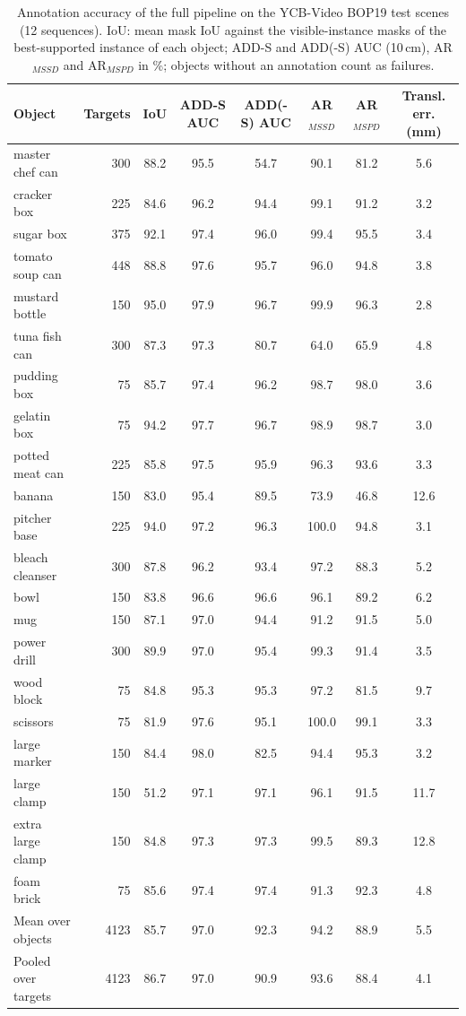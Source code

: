 \begin{table}[t]
\centering
\small
\caption{Annotation accuracy of the full pipeline on the YCB-Video BOP19 test scenes (12 sequences). IoU: mean mask IoU against the visible-instance masks of the best-supported instance of each object; ADD-S and ADD(-S) AUC (10\,cm), AR$_{MSSD}$ and AR$_{MSPD}$ in \%; objects without an annotation count as failures.}
\label{tab:annotation_accuracy}
\begin{tabular}{lrcccccc}
\hline
Object & Targets & IoU & ADD-S AUC & ADD(-S) AUC & AR$_{MSSD}$ & AR$_{MSPD}$ & Transl. err. (mm) \\
\hline
master chef can & 300 & 88.2 & 95.5 & 54.7 & 90.1 & 81.2 & 5.6 \\
cracker box & 225 & 84.6 & 96.2 & 94.4 & 99.1 & 91.2 & 3.2 \\
sugar box & 375 & 92.1 & 97.4 & 96.0 & 99.4 & 95.5 & 3.4 \\
tomato soup can & 448 & 88.8 & 97.6 & 95.7 & 96.0 & 94.8 & 3.8 \\
mustard bottle & 150 & 95.0 & 97.9 & 96.7 & 99.9 & 96.3 & 2.8 \\
tuna fish can & 300 & 87.3 & 97.3 & 80.7 & 64.0 & 65.9 & 4.8 \\
pudding box & 75 & 85.7 & 97.4 & 96.2 & 98.7 & 98.0 & 3.6 \\
gelatin box & 75 & 94.2 & 97.7 & 96.7 & 98.9 & 98.7 & 3.0 \\
potted meat can & 225 & 85.8 & 97.5 & 95.9 & 96.3 & 93.6 & 3.3 \\
banana & 150 & 83.0 & 95.4 & 89.5 & 73.9 & 46.8 & 12.6 \\
pitcher base & 225 & 94.0 & 97.2 & 96.3 & 100.0 & 94.8 & 3.1 \\
bleach cleanser & 300 & 87.8 & 96.2 & 93.4 & 97.2 & 88.3 & 5.2 \\
bowl & 150 & 83.8 & 96.6 & 96.6 & 96.1 & 89.2 & 6.2 \\
mug & 150 & 87.1 & 97.0 & 94.4 & 91.2 & 91.5 & 5.0 \\
power drill & 300 & 89.9 & 97.0 & 95.4 & 99.3 & 91.4 & 3.5 \\
wood block & 75 & 84.8 & 95.3 & 95.3 & 97.2 & 81.5 & 9.7 \\
scissors & 75 & 81.9 & 97.6 & 95.1 & 100.0 & 99.1 & 3.3 \\
large marker & 150 & 84.4 & 98.0 & 82.5 & 94.4 & 95.3 & 3.2 \\
large clamp & 150 & 51.2 & 97.1 & 97.1 & 96.1 & 91.5 & 11.7 \\
extra large clamp & 150 & 84.8 & 97.3 & 97.3 & 99.5 & 89.3 & 12.8 \\
foam brick & 75 & 85.6 & 97.4 & 97.4 & 91.3 & 92.3 & 4.8 \\
\hline
Mean over objects & 4123 & 85.7 & 97.0 & 92.3 & 94.2 & 88.9 & 5.5 \\
Pooled over targets & 4123 & 86.7 & 97.0 & 90.9 & 93.6 & 88.4 & 4.1 \\
\hline
\end{tabular}
\end{table}
